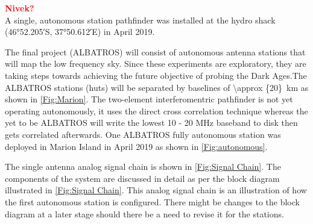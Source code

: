 \documentclass{ws-jai}
\begin{document}
\textcolor{red}{\bf Nivek?} \\

A single, autonomous station pathfinder was installed at the hydro
shack (\ang{46;52.205;}S, \ang{37;50.612;}E) in April 2019.

The final project (ALBATROS) will consist of autonomous antenna
stations that will map the low frequency sky. Since these experiments
are exploratory, they are taking steps towards achieving the future
objective of probing the Dark Ages.The ALBATROS stations (huts) will
be separated by baselines of \SI{\approx {20}}{km} as shown in
\autoref{Fig:Marion}. The two-element interferomentric pathfinder is
not yet operating autonomously, it uses the direct cross correlation
technique whereas the yet to be ALBATROS will write the lowest 10 - 20
MHz baseband to disk then gets correlated afterwards. One ALBATROS
fully autonomous station was deployed in Marion Island in April 2019
as shown in \autoref{Fig:autonomous}.

The single antenna analog signal chain is shown in \autoref{Fig:Signal
  Chain}. The components of the system are discussed in detail as per
the block diagram illustrated in \autoref{Fig:Signal Chain}. This
analog signal chain is an illustration of how the first autonomous
station is configured. There might be changes to the block diagram at
a later stage should there be a need to revise it for the stations.


% 
\end{document}
